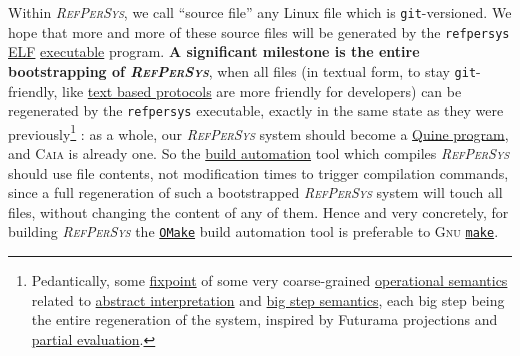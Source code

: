 \documentclass{IEEEtran}
\newcommand{\RefPerSys}{{\textit{\textsc{RefPerSys}}}}
\begin{document}
Within {\RefPerSys}, we call ``source file'' any Linux file which is
\texttt{git}-versioned. We hope that more and more of these source
files will be generated by the \texttt{refpersys}
\href{https://en.wikipedia.org/wiki/Executable\_and\_Linkable_Format}{ELF}
\href{https://en.wikipedia.org/wiki/Executable}{executable}
program. \textbf{A significant milestone is the entire bootstrapping
  of \RefPerSys}, when all files (in textual form, to stay
\texttt{git}-friendly, like
\href{https://en.wikipedia.org/wiki/Text-based_protocol}{text based
  protocols} are more friendly for developers) can be regenerated by
the \texttt{refpersys} executable, exactly in the same state as they
were previously\footnote{Pedantically, some
\href{https://en.wikipedia.org/wiki/Fixed\_point\_(mathematics)}{fixpoint}
of some very coarse-grained
\href{https://en.wikipedia.org/wiki/Operational\_semantics}{operational
  semantics} related to
\href{https://en.wikipedia.org/wiki/Abstract\_interpretation}{abstract
  interpretation} and
\href{https://en.wikipedia.org/wiki/Operational\_semantics\#Structural\_operational\_semantics}{big
  step semantics}, each big step being the entire regeneration of the
system, inspired by Futurama projections and
\href{https://en.wikipedia.org/wiki/Partial\_evaluation}{partial
  evaluation}.} : as a whole, our {\RefPerSys} system should become a
\href{https://en.wikipedia.org/wiki/Quine\_(computing)}{Quine
  program}, and \textsc{Caia} is already one. So the
\href{https://en.wikipedia.org/wiki/Build\_automation}{build
  automation} tool which compiles {\RefPerSys} should use file
contents, not modification times to trigger compilation commands,
since a full regeneration of such a bootstrapped {\RefPerSys} system
will touch all files, without changing the content of any of
them. Hence and very concretely, for building {\RefPerSys} the
\href{http://projects.camlcity.org/projects/omake.html}{\texttt{OMake}}
build automation tool is preferable to \textsc{Gnu}
\href{https://www.gnu.org/software/make/}{\texttt{make}}.
\end{document}
